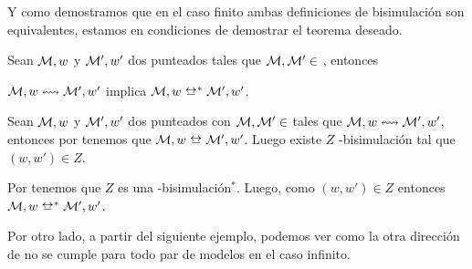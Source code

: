 Y como demostramos que en el caso finito ambas definiciones de bisimulación son equivalentes, estamos en condiciones de demostrar el teorema deseado. 

\begin{teorema}\label{thm:new-bisim-finite-equiv}
    Sean $\mathcal{M},w$ y $\mathcal{M}',w'$ dos \ultss punteados tales que $\mathcal{M}, \mathcal{M}' \in$ \MFD, entonces
    \begin{center}
        $\mathcal{M},w \mathrel{\leftrightsquigarrow} \mathcal{M}', w'$ implica $\model,w \bisim^* \model', w'$.
    \end{center}
\end{teorema}

\begin{demostracion}
    Sean $\mathcal{M},w$ y $\mathcal{M}',w'$ dos \ultss punteados con $\mathcal{M}, \mathcal{M}' \in $ \MFD tales que $\mathcal{M},w \mathrel{\leftrightsquigarrow} \mathcal{M}', w'$, 
    entonces por  tenemos que $\model,w \bisim \model', w'$. 
    Luego existe $Z$ \KHilogic-bisimulación tal que $(w,w') \in Z$.

    Por  tenemos que $Z$ es una \KHilogic-bisimulación$^*$. Luego, como $(w,w') \in Z$ 
    entonces $\model,w \bisim^* \model', w'$.
\end{demostracion}

Por otro lado, a partir del siguiente ejemplo, podemos ver como la otra dirección de  no se cumple para todo 
par de modelos en el caso infinito.

